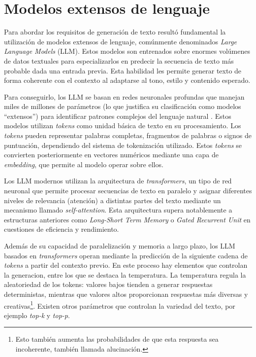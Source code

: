 
\section{Modelos extensos de lenguaje}
Para abordar los requisitos de generación de texto resultó fundamental la utilización 
de modelos extensos de lenguaje, comúnmente denominados \textit{Large Language Models} (LLM).
Estos modelos son entrenados sobre enormes volúmenes de datos textuales para especializarlos
en predecir la secuencia de texto más probable dada una entrada previa.
Esta habilidad les permite generar texto de forma coherente con el contexto
al adaptarse al tono, estilo y contenido esperado.

Para conseguirlo, los LLM se basan en redes neuronales profundas que manejan miles de millones de parámetros
(lo que justifica su clasificación como modelos ``extensos'') para identificar patrones complejos del lenguaje natural \cite{att_is_all_you_need}. 
Estos modelos utilizan \textit{tokens} como unidad básica de texto en su procesamiento.
Los \textit{tokens} pueden representar palabras completas, fragmentos de palabras o signos de puntuación,
dependiendo del sistema de tokenización utilizado.
Estos \textit{tokens} se convierten posteriormente en vectores numéricos
mediante una capa de \textit{embedding}\cite{mikolov2013efficient}, que permite al modelo operar sobre ellos.

Los LLM modernos utilizan la arquitectura de \textit{transformers}\cite{att_is_all_you_need},
un tipo de red neuronal que permite procesar secuencias de texto en paralelo y asignar diferentes niveles de relevancia
(atención) a distintas partes del texto mediante un mecanismo llamado \textit{self-attention}.
Esta arquitectura supera notablemente a estructuras anteriores como \textit{Long-Short Term Memory}\cite{hochreiter1997long}
o \textit{Gated Recurrent Unit}\cite{cho2014learning} en cuestiones de eficiencia y rendimiento.

Además de su capacidad de paralelización y memoria a largo plazo, los LLM basados en \textit{transformers} operan 
mediante la predicción de la siguiente cadena de \textit{tokens} a partir del contexto previo.
En este proceso hay elementos que controlan la generacion, entre los que se destaca la temperatura\cite{radford2019language}.
La temperatura regula la aleatoriedad de los tokens: valores bajos tienden a generar respuestas deterministas,
mientras que valores altos proporcionan respuestas más diversas y creativas\footnote{
	Esto también aumenta las probabilidades de que esta respuesta sea incoherente, también llamada alucinación.
}. Existen otros parámetros que controlan la variedad del texto, por ejemplo \textit{top-k} y \textit{top-p}\cite{holtzman2019curious}.

